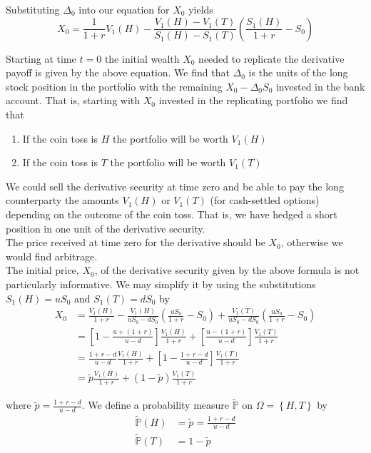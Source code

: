 \documentclass[12pt]{article}
\newlength\tindent
\renewcommand{\indent}{\hspace*{\tindent}}
\renewcommand{\P}{\mathbb P}
\begin{document}
Substituting $\Delta_0$ into our equation for $X_0$ yields
\begin{equation*}
	X_0 = \frac{1}{1 + r}V_1(H) - \frac{V_1(H) - V_1(T)}{S_1(H) - S_1(T)} \left( \frac{S_1(H)}{1 + r} - S_0 \right)
\end{equation*}

\indent Starting at time $t = 0$ the initial wealth $X_0$ needed to replicate the derivative payoff is given by the above equation. We find that $\Delta_0$ is the units of the long stock position in the portfolio with the remaining $X_0 - \Delta_0S_0$ invested in the bank account. That is, starting with $X_0$ invested in the replicating portfolio we find that
\begin{enumerate}[]
	\item If the coin toss is $H$ the portfolio will be worth $V_1(H)$
	\item If the coin toss is $T$ the portfolio will be worth $V_1(T)$
\end{enumerate}

\indent We could sell the derivative security at time zero and be able to pay the long counterparty the amounts $V_1(H)$ or $V_1(T)$ (for cash-settled options) depending on the outcome of the coin toss. That is, we have hedged a short position in one unit of the derivative security. \\

\indent The price received at time zero for the derivative should be $X_0$, otherwise we would find arbitrage. \\

\indent The initial price, $X_0$, of the derivative security given by the above formula is not particularly informative. We may simplify it by using the substitutions $S_1(H) = uS_0$ and $S_1(T) = dS_0$ by
\begin{align*}
	X_0 &= \frac{V_1(H)}{1 + r} - \frac{V_1(H)}{uS_0 - dS_0} \left(\frac{uS_0}{1 + r} - S_0\right) + \frac{V_1(T)}{uS_0 - dS_0}\left( \frac{uS_0}{1 + r} - S_0 \right) \\
	&= \left[ 1 - \frac{u + (1 + r)}{u - d} \right] \frac{V_1(H)}{1 + r} + \left[ \frac{u - (1 + r)}{u - d}\right]\frac{V_1(T)}{1 + r} \\
	&= \frac{1 + r - d}{u - d}\frac{V_1(H)}{1 + r} + \left[1 - \frac{1 + r - d}{u - d}\right] \frac{V_1(T)}{1 + r} \\
	&= \tilde{p}\frac{V_1(H)}{1 + r} + (1 - \tilde{p})\frac{V_1(T)}{1 + r}
\end{align*}

where $\tilde{p} = \frac{1 + r - d}{u - d}$. We define a probability measure $\tilde{\P}$ on $\Omega = \left\{ H, T \right\}$ by 
\begin{align*}
	\tilde{\P}(H) &= \tilde{p} = \frac{1 + r - d}{u - d} \\
	\tilde{\P}(T) &= 1 - \tilde{p}
\end{align*}
\end{document}
